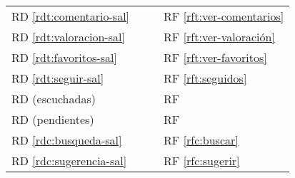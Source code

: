 \documentclass[
  12pt,
  a4paper,
  DIV=12,
  spanish,
]{scrartcl}
\newcounter{RF}
\newcounter{RD}
\begin{document}
\begin{tabularx}{\textwidth}{l|XXX}

  RD \ref{rdt:comentario-sal} & & & RF \ref{rft:ver-comentarios} \\
  RD \ref{rdt:valoracion-sal} & & & RF \ref{rft:ver-valoración} \\
  RD \ref{rdt:favoritos-sal} & & & RF \ref{rft:ver-favoritos} \\
  RD \ref{rdt:seguir-sal} & & & RF \ref{rft:seguidos} \\
  RD (escuchadas) & & & RF  \\
  RD (pendientes) & & & RF  \\
  RD \ref{rdc:busqueda-sal} & & & RF \ref{rfc:buscar} \\
  RD \ref{rdc:sugerencia-sal} & & & RF \ref{rfc:sugerir} \\

\end{tabularx}
\end{document}
